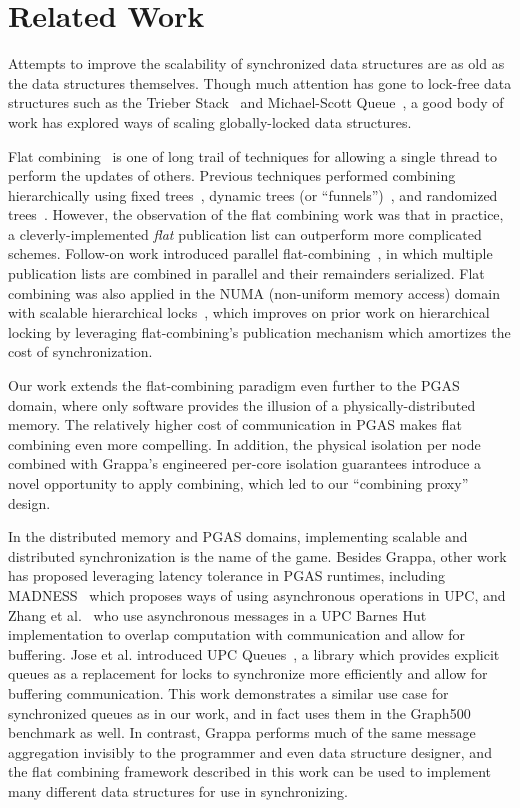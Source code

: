 \section{Related Work}
Attempts to improve the scalability of synchronized data structures are as old as the data structures themselves. Though much attention has gone to lock-free data structures such as the Trieber Stack~\cite{trieber} and Michael-Scott Queue~\cite{msqueue}, a good body of work has explored ways of scaling globally-locked data structures.

Flat combining~\cite{flatCombining} is one of long trail of techniques for allowing a single thread to perform the updates of others. Previous techniques performed combining hierarchically using fixed trees~\cite{yew:combining-trees}, dynamic trees (or ``funnels'')~\cite{funnels}, and randomized trees~\cite{edtrees}. However, the observation of the flat combining work was that in practice, a cleverly-implemented \emph{flat} publication list can outperform more complicated schemes.
Follow-on work introduced parallel flat-combining~\cite{scalableFCQueues}, in which multiple publication lists are combined in parallel and their remainders serialized.
Flat combining was also applied in the NUMA (non-uniform memory access) domain with scalable hierarchical locks~\cite{fcNUMALocks}, which improves on prior work on hierarchical locking by leveraging flat-combining's publication mechanism which amortizes the cost of synchronization.

Our work extends the flat-combining paradigm even further to the PGAS domain, where only software provides the illusion of a physically-distributed memory. The relatively higher cost of communication in PGAS makes flat combining even more compelling. In addition, the physical isolation per node  combined with Grappa's engineered per-core isolation guarantees introduce a novel opportunity to apply combining, which led to our ``combining proxy'' design.

In the distributed memory and PGAS domains, implementing scalable and distributed synchronization is the name of the game.
Besides Grappa, other work has proposed leveraging latency tolerance in PGAS runtimes, including MADNESS~\cite{shet:async-upc} which proposes ways of using asynchronous operations in UPC, and Zhang et al.~\cite{zhang:barnes-hut} who use asynchronous messages in a UPC Barnes Hut implementation to overlap computation with communication and allow for buffering.
Jose et al. introduced UPC Queues~\cite{jose:upc-queues}, a library which provides explicit queues as a replacement for locks to synchronize more efficiently and allow for buffering communication. This work demonstrates a similar use case for synchronized queues as in our work, and in fact uses them in the Graph500 benchmark as well. In contrast, Grappa performs much of the same message aggregation invisibly to the programmer and even data structure designer, and the flat combining framework described in this work can be used to implement many different data structures for use in synchronizing.

